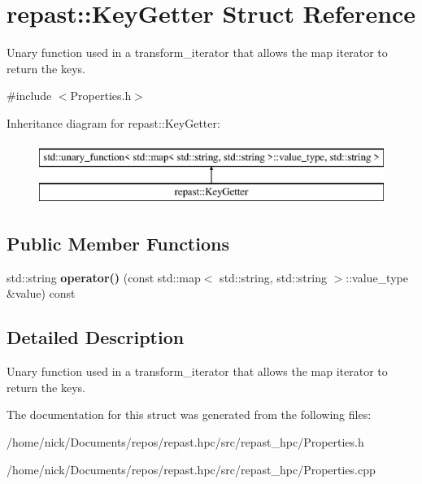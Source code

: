 \hypertarget{structrepast_1_1_key_getter}{\section{repast\-:\-:Key\-Getter Struct Reference}
\label{structrepast_1_1_key_getter}
}


Unary function used in a transform\-\_\-iterator that allows the map iterator to return the keys.  




{\ttfamily \#include $<$Properties.\-h$>$}

Inheritance diagram for repast\-:\-:Key\-Getter\-:\begin{figure}[H]
\begin{center}
\leavevmode
\includegraphics[height=2.000000cm]{structrepast_1_1_key_getter}
\end{center}
\end{figure}
\subsection*{Public Member Functions}
\begin{DoxyCompactItemize}
\item 
\hypertarget{structrepast_1_1_key_getter_a8e4c794acce2375ef4e3015443b9a496}{std\-::string {\bfseries operator()} (const std\-::map$<$ std\-::string, std\-::string $>$\-::value\-\_\-type \&value) const }\label{structrepast_1_1_key_getter_a8e4c794acce2375ef4e3015443b9a496}

\end{DoxyCompactItemize}


\subsection{Detailed Description}
Unary function used in a transform\-\_\-iterator that allows the map iterator to return the keys. 

The documentation for this struct was generated from the following files\-:\begin{DoxyCompactItemize}
\item 
/home/nick/\-Documents/repos/repast.\-hpc/src/repast\-\_\-hpc/Properties.\-h\item 
/home/nick/\-Documents/repos/repast.\-hpc/src/repast\-\_\-hpc/Properties.\-cpp\end{DoxyCompactItemize}

